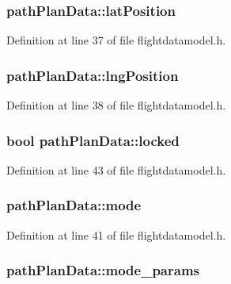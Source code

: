 \hypertarget{group___path_ga741da9e938717a4dba1a1b28afc94d07}{
\subsubsection[{lat\-Position}]{ path\-Plan\-Data\-::lat\-Position}}\label{group___path_ga741da9e938717a4dba1a1b28afc94d07}


Definition at line 37 of file flightdatamodel.\-h.

\hypertarget{group___path_ga28464ee2b2537b0bc670193bc29627b7}{
\subsubsection[{lng\-Position}]{ path\-Plan\-Data\-::lng\-Position}}\label{group___path_ga28464ee2b2537b0bc670193bc29627b7}


Definition at line 38 of file flightdatamodel.\-h.

\hypertarget{group___path_ga5e07c3e8bda93b1d5dba9dd3d35c0280}{
\subsubsection[{locked}]{\setlength{\rightskip}{0pt plus 5cm}bool path\-Plan\-Data\-::locked}}\label{group___path_ga5e07c3e8bda93b1d5dba9dd3d35c0280}


Definition at line 43 of file flightdatamodel.\-h.

\hypertarget{group___path_gabea436564f0d9df2abf6b4c35d505753}{
\subsubsection[{mode}]{ path\-Plan\-Data\-::mode}}\label{group___path_gabea436564f0d9df2abf6b4c35d505753}


Definition at line 41 of file flightdatamodel.\-h.

\hypertarget{group___path_gaba12f55aa813b5f1dc707e3c1814ab14}{
\subsubsection[{mode\-\_\-params}]{ path\-Plan\-Data\-::mode\-\_\-params}}\label{group___path_gaba12f55aa813b5f1dc707e3c1814ab14}



